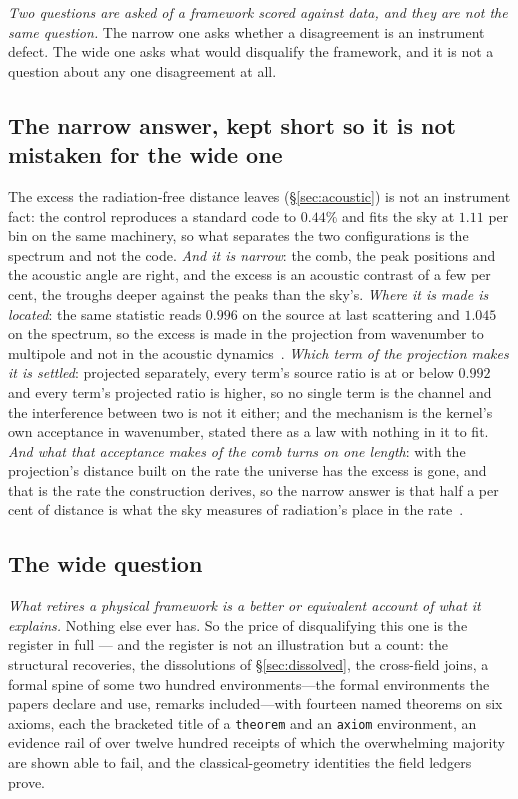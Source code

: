 \documentclass[11pt,a4paper]{article}
\theoremstyle{plain}
\theoremstyle{definition}
\begin{document}
\emph{Two questions are asked of a framework scored against data, and they are not
the same question.} The narrow one asks whether a disagreement is an instrument defect. The wide one asks
what would disqualify the framework, and it is not a question about any one disagreement at all.

\subsection{The narrow answer, kept short so it is not mistaken for the wide one}

The excess the radiation-free distance leaves (\S\ref{sec:acoustic}) is not an instrument fact: the control reproduces a standard
code to $0.44\%$ and fits the sky at $1.11$ per bin on the same machinery, so what separates the two
configurations is the spectrum and not the code. \emph{And it is narrow}: the comb, the peak positions and the acoustic angle are
right, and the excess is an acoustic contrast of a few per cent, the troughs deeper against the peaks than the
sky's. \emph{Where it is made is located}: the same statistic reads $0.996$ on the source at last scattering
and $1.045$ on the spectrum, so the excess is made in the projection from wavenumber to multipole and not in
the acoustic dynamics~\cite{JanzenCRcosmology}. \emph{Which term of the projection makes it is
settled}: projected separately, every term's source ratio is at or below $0.992$ and every term's
projected ratio is higher, so no single term is the channel and the interference between two is not
it either; and the mechanism is the kernel's own acceptance in wavenumber, stated there as a law with
nothing in it to fit. \emph{And what that acceptance makes of the comb turns on one length}: with the
projection's distance built on the rate the universe has the excess is gone, and that is the rate the
construction derives, so the narrow answer is that half a per cent of distance is what the sky measures of
radiation's place in the rate~\cite{JanzenCRcosmology}.

\subsection{The wide question}

\emph{What retires a physical framework is a better or equivalent account of what it explains.} Nothing else
ever has. So the price of disqualifying this one is the register in full --- and the register is not an
illustration but a count: the structural recoveries, the dissolutions of \S\ref{sec:dissolved}, the
cross-field joins, a formal spine of some two hundred environments---the formal environments the papers declare and use, remarks included---with fourteen named theorems on six axioms, each the bracketed title of a \texttt{theorem} and an \texttt{axiom} environment, an evidence rail of over twelve hundred receipts of which the overwhelming majority are shown able to
fail, and the classical-geometry identities the field ledgers prove.
\end{document}
